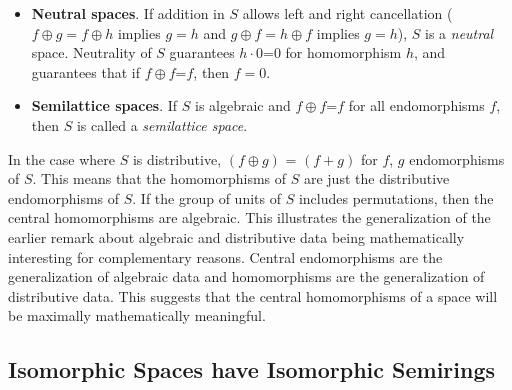 \documentclass[11pt]{article}
\begin{document}
\begin{itemize}
\item{{\bf Neutral spaces}. If addition in $S$ allows left and right cancellation ($f\oplus g=f\oplus h$ implies $g=h$ and $g\oplus f=h\oplus f$ implies $g=h$), 
$S$ is a {\it neutral} space.  Neutrality of $S$ guarantees $h\cdot 0$=0 for homomorphism $h$, and guarantees that if $f\oplus f$=$f$, then $f=0$.} 

\item{{\bf Semilattice spaces}.  If $S$ is algebraic and $f\oplus f$=$f$ for all endomorphisms $f$, then $S$ is called a {\it semilattice space}.}

\end{itemize} 
In the case where $S$ is distributive, $(f\oplus g)$ = $(f+g)$ for $f$, $g$ endomorphisms of $S$.  This means that the homomorphisms of $S$ are 
just the distributive endomorphisms of $S$.  If the group of units of $S$ includes permutations, then the central homomorphisms are algebraic.  This illustrates 
the generalization of the earlier remark about algebraic and distributive data being mathematically interesting for complementary reasons.  Central 
endomorphisms are the generalization of algebraic data and homomorphisms are the generalization of distributive data.  
This suggests that the central homomorphisms of a space will be maximally mathematically meaningful.

\subsection{Isomorphic Spaces have Isomorphic Semirings} 
\end{document}
